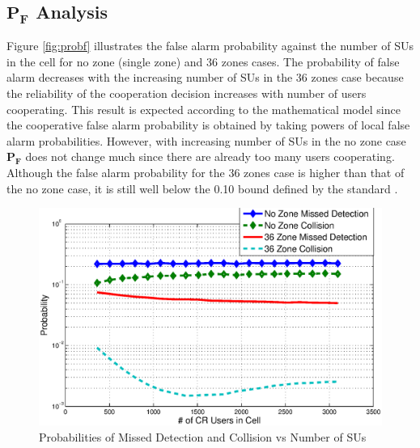 \documentclass[conference,compsoc]{IEEEtran}
\newcommand{\probf}{\mathbf{P_F}}
\begin{document}
\subsection{$\probf$ Analysis}
Figure \ref{fig:probf} illustrates the false alarm probability against the number of SUs in the cell for no zone (single zone) and 36 zones cases. The probability of false alarm decreases with the increasing number of SUs in the 36 zones case because the reliability of the cooperation decision increases with number of users cooperating. This result is expected according to the mathematical model since the cooperative false alarm probability is obtained by taking powers of local false alarm probabilities. However, with increasing number of SUs in the no zone case  $\probf$ does not change much since there are already too many users cooperating. Although the false alarm probability for the 36 zones case is higher than that of the no zone case, it is still well below the 0.10 bound defined by the standard \cite{wranstandard}.

\begin{figure}[b]
\centering
\includegraphics[width=0.99\columnwidth,keepaspectratio] {figs/pm_c.eps}
\caption{Probabilities of Missed Detection and Collision vs Number of
SUs} \label{fig:probm}
\end{figure}
\end{document}
